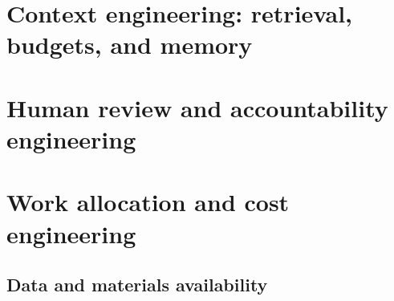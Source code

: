 \documentclass[11pt,oneside]{book}
\begin{document}








\part{Context engineering: retrieval, budgets, and memory}









\part{Human review and accountability engineering}





\part{Work allocation and cost engineering}







\backmatter
\chapter*{Data and materials availability}

\end{document}
